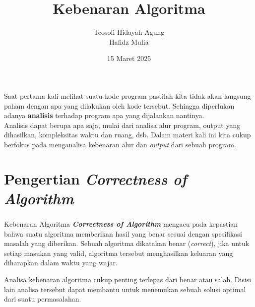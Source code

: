 \documentclass{../praktikum-ppt}
\author[Tew \& Haf]{Teosofi Hidayah Agung \\ Hafidz Mulia}
\date{15 Maret 2025}
\title[Alpro 2 - Week 1]{Kebenaran Algoritma}
\institute[Matematika ITS]{Departemen Matematika\\ Institut Teknologi Sepuluh Nopember}
\begin{document}
{
\begin{frame}
  \titlepage
\end{frame}
}


    
    \begin{frame}
        \begin{masalah}
            Saat pertama kali melihat suatu kode program pastilah kita tidak akan langsung paham dengan apa yang dilakukan oleh kode tersebut. Sehingga diperlukan adanya \textbf{analisis} terhadap program apa yang dijalankan nantinya.\\

            Analisis dapat berupa apa saja, mulai dari analisa alur program, output yang dihasilkan, kompleksitas waktu dan ruang, dsb. Dalam materi kali ini kita cukup berfokus pada menganalisa kebenaran alur dan \textit{output} dari sebuah program.
        \end{masalah}
    \end{frame}

    \section{Pengertian \textit{Correctness of Algorithm}}
    \begin{frame}
      \frametitle{\insertsection}
      \begin{block}{Kebenaran Algoritma}
        \textit{\textbf{Correctness of Algorithm}} mengacu pada kepastian bahwa suatu algoritma memberikan hasil yang benar sesuai dengan spesifikasi masalah yang diberikan. Sebuah algoritma dikatakan benar (\textit{correct}), jika untuk setiap masukan yang valid, algoritma tersebut menghasilkan keluaran yang diharapkan dalam waktu yang wajar.
      \end{block}
      Analisa kebenaran algoritma cukup penting terlepas dari benar atau salah. Disisi lain analisa tersebut dapat membantu untuk menemukan sebuah solusi optimal dari suatu permasalahan.
    \end{frame}
\end{document}
